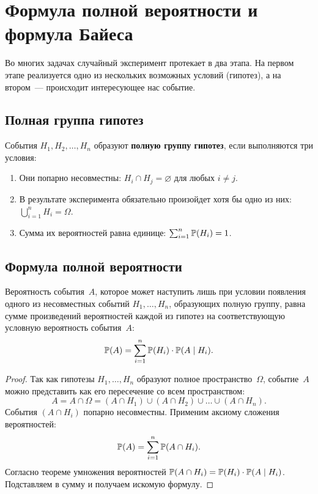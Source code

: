 \section{Формула полной вероятности и формула Байеса}

Во многих задачах случайный эксперимент протекает в два этапа. На первом этапе реализуется одно из нескольких возможных условий (гипотез), а на втором~--- происходит интересующее нас событие.

\subsection{Полная группа гипотез}

\begin{definition}
События $H_1, H_2, \dots, H_n$ образуют \textbf{полную группу гипотез}, если выполняются три условия:
\begin{enumerate}
\item Они попарно несовместны: $H_i \cap H_j = \varnothing$ для любых $i \neq j$.
\item В результате эксперимента обязательно произойдет хотя бы одно из них: $\bigcup_{i=1}^n H_i = \Omega$.
\item Сумма их вероятностей равна единице: $\sum_{i=1}^n \mathbb{P}(H_i) = 1$.
\end{enumerate}
\end{definition}

\subsection{Формула полной вероятности}

\begin{theorem}
Вероятность события~$A$, которое может наступить лишь при условии появления одного из несовместных событий $H_1, \dots, H_n$, образующих полную группу, равна сумме произведений вероятностей каждой из гипотез на соответствующую условную вероятность события~$A$:
\[
\mathbb{P}(A) = \sum_{i=1}^n \mathbb{P}(H_i) \cdot \mathbb{P}(A \mid H_i).
\]
\end{theorem}

\begin{proof}
Так как гипотезы $H_1, \dots, H_n$ образуют полное пространство~$\Omega$, событие~$A$ можно представить как его пересечение со всем пространством:
\[
A = A \cap \Omega = (A \cap H_1) \cup (A \cap H_2) \cup \dots \cup (A \cap H_n).
\]
События $(A \cap H_i)$ попарно несовместны. Применим аксиому сложения вероятностей:
\[
\mathbb{P}(A) = \sum_{i=1}^n \mathbb{P}(A \cap H_i).
\]
Согласно теореме умножения вероятностей $\mathbb{P}(A \cap H_i) = \mathbb{P}(H_i) \cdot \mathbb{P}(A \mid H_i)$. Подставляем в сумму и получаем искомую формулу.
\end{proof}

